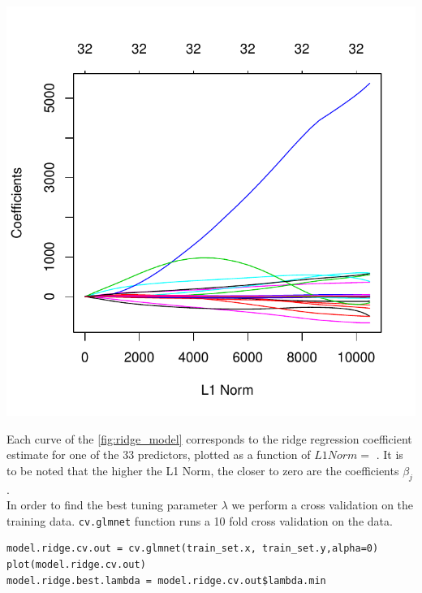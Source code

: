 \documentclass[]{report}
\begin{document}
\begin{center}
	\includegraphics[width=0.8\linewidth]{Figures/ridge_model.pdf}
	\label{fig:ridge_model}
\end{center}

Each curve of the \ref{fig:ridge_model} corresponds to the ridge regression coefficient estimate for one of the 33 predictors, plotted as a function of $L1 Norm =$ . It is to be noted that the higher the L1 Norm, the closer to zero are the coefficients $\beta_{j}$.\\


In order to find the best tuning parameter $\lambda$ we perform a cross validation on the training data. \texttt{cv.glmnet} function runs a 10 fold cross validation on the data.

\begin{lstlisting}
model.ridge.cv.out = cv.glmnet(train_set.x, train_set.y,alpha=0)
plot(model.ridge.cv.out)
model.ridge.best.lambda = model.ridge.cv.out$lambda.min
\end{lstlisting}
\end{document}
